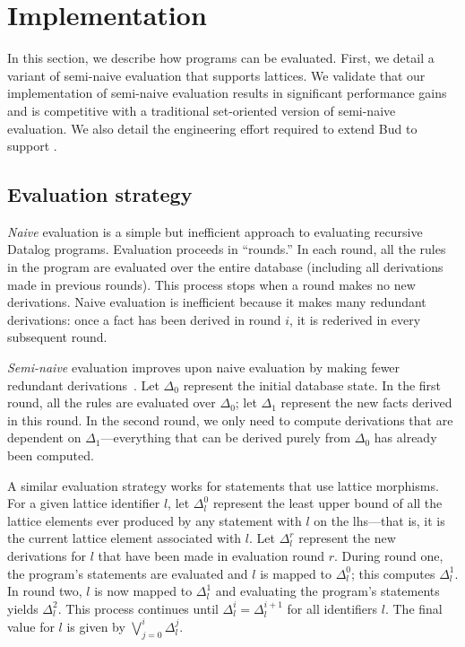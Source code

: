 \section{Implementation}
\label{sec:impl}

In this section, we describe how \lang programs can be evaluated. First, we
detail a variant of semi-naive evaluation that supports lattices. We validate
that our implementation of semi-naive evaluation results in significant
performance gains and is competitive with a traditional set-oriented version of
semi-naive evaluation. We also detail the engineering effort required to extend
Bud to support \lang. %

\subsection{Evaluation strategy}
\label{sec:lattice-eval-strat}
\emph{Naive} evaluation is a simple but inefficient approach to evaluating
recursive Datalog programs. Evaluation proceeds in ``rounds.'' In each round, all
the rules in the program are evaluated over the entire database (including all
derivations made in previous rounds). This process stops when a round makes no
new derivations. Naive evaluation is inefficient because it makes many redundant
derivations: once a fact has been derived in round $i$, it is rederived in every
subsequent round.

\emph{Semi-naive} evaluation improves upon naive evaluation by making fewer
redundant derivations~\cite{Balbin1987}. Let $\Delta_0$ represent the initial
database state. In the first round, all the rules are evaluated over $\Delta_0$;
let $\Delta_1$ represent the new facts derived in this round. In the second
round, we only need to compute derivations that are dependent on
$\Delta_1$---everything that can be derived purely from $\Delta_0$ has already
been computed.

A similar evaluation strategy works for \lang statements that use lattice
morphisms. For a given lattice identifier $l$, 
let $\Delta_l^0$ represent the least upper bound of all the lattice
elements ever produced by any statement with $l$ on the lhs---that is, it is the
current lattice element associated with $l$. 
Let $\Delta^r_l$ represent the new
derivations for $l$ that have been made in evaluation round $r$. During round
one, the program's statements are evaluated and $l$ is mapped to $\Delta_l^0$; this
computes $\Delta^1_l$. In round two, $l$ is now mapped to $\Delta^1_l$ and
evaluating the program's statements yields $\Delta^2_l$. This process continues
until $\Delta^i_l = \Delta^{i+1}_l$ for all identifiers $l$. 
The final value for $l$ is given by $\bigvee_{j=0}^i \Delta^j_l$.


